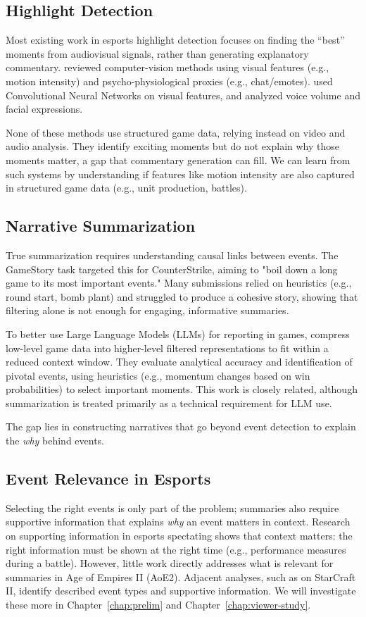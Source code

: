 \subsection{Highlight Detection}
Most existing work in esports highlight detection focuses on finding the ``best'' moments from audiovisual signals, rather than generating explanatory commentary. \citet{chu2017} reviewed computer-vision methods using visual features (e.g., motion intensity) and psycho-physiological proxies (e.g., chat/emotes). \citet{song2016} used Convolutional Neural Networks on visual features, and \citet{ringer2018} analyzed voice volume and facial expressions.

None of these methods use structured game data, relying instead on video and audio analysis. They identify exciting moments but do not explain why those moments matter, a gap that commentary generation can fill. We can learn from such systems by understanding if features like motion intensity are also captured in structured game data (e.g., unit production, battles).

\subsection{Narrative Summarization}
True summarization requires understanding causal links between events. The GameStory task \cite{lux2018, lux2019a, ninh2018, wutti2018} targeted this for CounterStrike, aiming to "boil down a long game to its most important events." Many submissions relied on heuristics (e.g., round start, bomb plant) and struggled to produce a cohesive story, showing that filtering alone is not enough for engaging, informative summaries.

To better use Large Language Models (LLMs) for reporting in games, \citet{kim2025} compress low-level game data into higher-level filtered representations to fit within a reduced context window. They evaluate analytical accuracy and identification of pivotal events, using heuristics (e.g., momentum changes based on win probabilities) to select important moments. This work is closely related, although summarization is treated primarily as a technical requirement for LLM use.

The gap lies in constructing narratives that go beyond event detection to explain the \textit{why} behind events.

\subsection{Event Relevance in Esports}
Selecting the right events is only part of the problem; summaries also require supportive information that explains \textit{why} an event matters in context. Research on supporting information in esports spectating shows that context matters: the right information must be shown at the right time \cite{charleer2018} (e.g., performance measures during a battle). However, little work directly addresses what is relevant for summaries in Age of Empires II (AoE2). Adjacent analyses, such as \citet{penney2021} on StarCraft II, identify described event types and supportive information. We will investigate these more in Chapter~\ref{chap:prelim} and Chapter~\ref{chap:viewer-study}.

